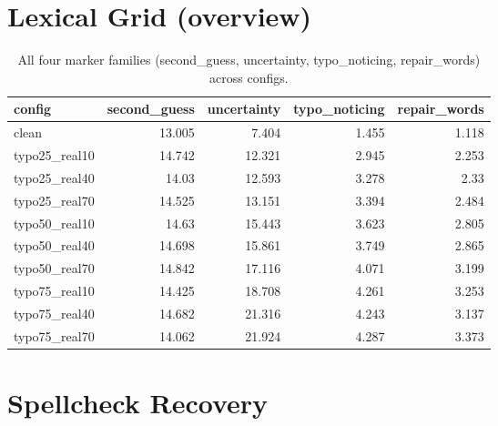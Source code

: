 \documentclass[11pt]{article}
\begin{document}
\section*{Lexical Grid (overview)}
\begin{table}[H]
\centering
\caption{All four marker families (second\_guess, uncertainty, typo\_noticing, repair\_words) across configs.}
\small
\begin{adjustbox}{max width=\textwidth}
\begin{tabular}{lrrrr}
\toprule
\textbf{config} & \textbf{second\_guess} & \textbf{uncertainty} & \textbf{typo\_noticing} & \textbf{repair\_words} \\
\midrule
clean & 13.005 & 7.404 & 1.455 & 1.118 \\
typo25\_real10 & 14.742 & 12.321 & 2.945 & 2.253 \\
typo25\_real40 & 14.03 & 12.593 & 3.278 & 2.33 \\
typo25\_real70 & 14.525 & 13.151 & 3.394 & 2.484 \\
typo50\_real10 & 14.63 & 15.443 & 3.623 & 2.805 \\
typo50\_real40 & 14.698 & 15.861 & 3.749 & 2.865 \\
typo50\_real70 & 14.842 & 17.116 & 4.071 & 3.199 \\
typo75\_real10 & 14.425 & 18.708 & 4.261 & 3.253 \\
typo75\_real40 & 14.682 & 21.316 & 4.243 & 3.137 \\
typo75\_real70 & 14.062 & 21.924 & 4.287 & 3.373 \\
\bottomrule
\end{tabular}
\end{adjustbox}
\end{table}

\section*{Spellcheck Recovery}

\end{document}
